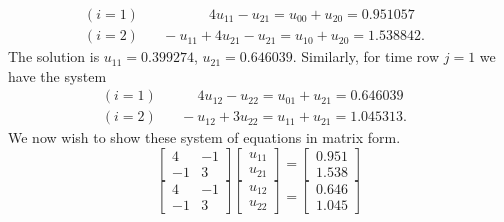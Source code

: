 \begin{equation*}
\begin{split}
(i=1)\hspace{60pt}4u_{11}-u_{21}=u_{00}+u_{20}=0.951057 &\\
(i=2)\hspace{20pt}-u_{11}+4u_{21}-u_{21}=u_{10}+u_{20}=1.538842. 
\end{split}
\end{equation*}
The solution is $u_{11}=0.399274$, $u_{21}=0.646039$. Similarly, for time row $j=1$ we have the system
\begin{equation*}
\begin{split}
(i=1)\hspace{35pt}4u_{12}-u_{22}=u_{01}+u_{21}=0.646039 &\\
(i=2)\hspace{20pt}-u_{12}+3u_{22}=u_{11}+u_{21}=1.045313.
\end{split}
\end{equation*}
We now wish to show these system of equations in matrix form.
\begin{equation*}
\begin{bmatrix}
4 & -1 \\ -1 & 3 
\end{bmatrix}
\begin{bmatrix}
u_{11} \\ u_{21}
\end{bmatrix}
=
\begin{bmatrix}
0.951 \\ 1.538
\end{bmatrix}
\end{equation*}
\begin{equation*}
\begin{bmatrix}
4 & -1 \\ -1 & 3 
\end{bmatrix}
\begin{bmatrix}
u_{12} \\ u_{22}
\end{bmatrix}
=
\begin{bmatrix}
0.646 \\ 1.045
\end{bmatrix}
\end{equation*}
